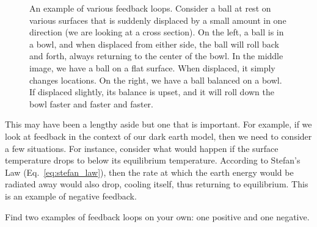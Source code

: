     \begin{figure}%
		\centering
    \caption{An example of various feedback loops. Consider a ball at rest on various surfaces that is suddenly displaced by a small amount in one direction (we are looking at a cross section). On the left, a ball is in a bowl, and when displaced from either side, the ball will roll back and forth, always returning to the center of the bowl. In the middle image, we have a ball on a flat surface. When displaced, it simply changes locations. On the right, we have a ball balanced on a bowl. If displaced slightly, its balance is upset, and it will roll down the bowl faster and faster and faster.}
    \label{fig:feedback}
    \end{figure}

    This may have been a lengthy aside but one that is important. For example, if we look at feedback in the context of our dark earth model, then we need to consider a few situations. For instance, consider what would happen if the surface temperature drops to below its equilibrium temperature. According to Stefan's Law (Eq.~\ref{eq:stefan_law}), then the rate at which the earth energy would be radiated away would also drop, cooling itself, thus returning to equilibrium. This is an example of negative feedback.

    \begin{exercise}
        Find two examples of feedback loops on your own: one positive and one negative.
        \label{ex:feedback_loops}
    \end{exercise}


